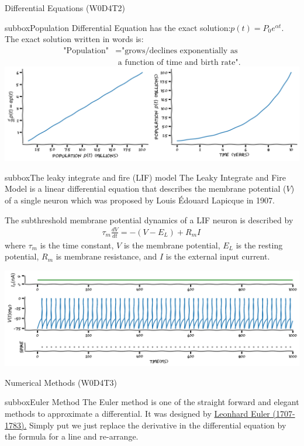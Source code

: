 \begin{multicols}{3}
\begin{textbox}{Differential Equations (W0D4T2) }
\begin{subbox}{subbox}{Population Differential Equation}
has the exact solution:$p(t) = P_0 e^{\alpha t}.$
The exact solution written in words is: 
\begin{align*}
\text{"Population"} &= \text{"grows/declines exponentially as}\\ &\text{ a function of time and birth rate"}.
\end{align*}
\centering
\includegraphics[scale=0.13]{Figures/PreCourse/CFigure5.png}
\end{subbox}
\begin{subbox}{subbox}{The leaky integrate and fire (LIF) model}
\scriptsize
The Leaky Integrate and Fire Model is a linear differential equation that describes the membrane potential ($V$) of a single neuron which was proposed by Louis Édouard Lapicque in 1907.

The subthreshold membrane potential dynamics of a LIF neuron is described by
\begin{align}
\tau_m\frac{dV}{dt} = -(V-E_L) + R_mI\,
\end{align}
where $\tau_m$ is the time constant, $V$ is the membrane potential,  $E_L$ is the resting potential, $R_m$ is membrane resistance, and $I$ is the external input current. 

\centering
\includegraphics[scale=0.15]{Figures/PreCourse/CFigure6.png}
\end{subbox}
\end{textbox}
\begin{textbox}{Numerical Methods (W0D4T3) }
\begin{subbox}{subbox}{Euler Method}
\scriptsize
The Euler method is one of the straight forward and elegant methods to approximate a differential. It was designed by \href{https://en.wikipedia.org/wiki/Leonhard_Euler}{Leonhard Euler (1707-1783).} 
Simply put we just replace the derivative in the differential equation by the formula for a line and re-arrange.


\end{subbox}
\end{textbox}
\end{multicols}
